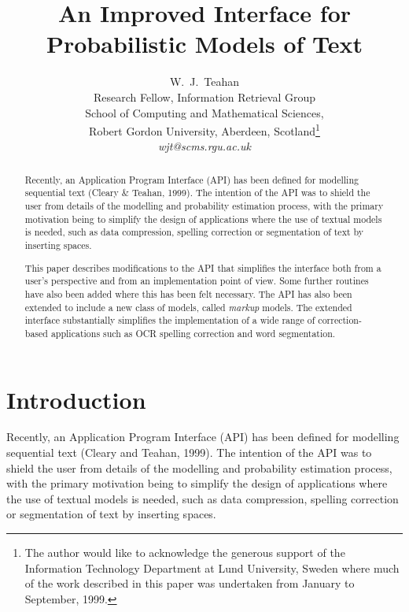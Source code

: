\documentclass[11pt]{article}
\begin{document}

\title{An Improved Interface for Probabilistic Models of Text}
\author{W.~J.~Teahan \\
        Research Fellow, Information Retrieval Group \\
        School of Computing and Mathematical Sciences, \\
        Robert Gordon University, Aberdeen, Scotland\thanks{The author would
        like to acknowledge the generous support of the Information Technology
        Department at Lund University, Sweden where much of the work described
        in this paper was undertaken from January to September, 1999.}\\
     {\em wjt@scms.rgu.ac.uk}
}
\maketitle

\begin{abstract}
Recently, an Application Program Interface (API) has been defined
for modelling sequential text (Cleary \& Teahan, 1999). The intention of the API
was to shield the user from details of the modelling and probability
estimation process, with the primary motivation being to simplify the design of
applications where the use of textual models is needed, such as
data compression, spelling correction or segmentation of text by
inserting spaces.

This paper describes modifications to the API that simplifies the interface both from
a user's perspective and from an implementation point of view. Some further routines
have also been added where this has been felt necessary.
The API has also been extended to include a new class of models, called
{\em markup} models. The extended interface substantially simplifies the
implementation of a wide range of correction-based applications such as OCR
spelling correction and word segmentation.

\end{abstract}

\section{Introduction}

\label{section.introduction}

Recently, an Application Program Interface (API) has been defined
for modelling sequential text (Cleary and Teahan, 1999). The intention of the API
was to shield the user from details of the modelling and probability
estimation process, with the primary motivation being to simplify the design of
applications where the use of textual models is needed, such as
data compression, spelling correction or segmentation of text by
inserting spaces.
\end{document}
